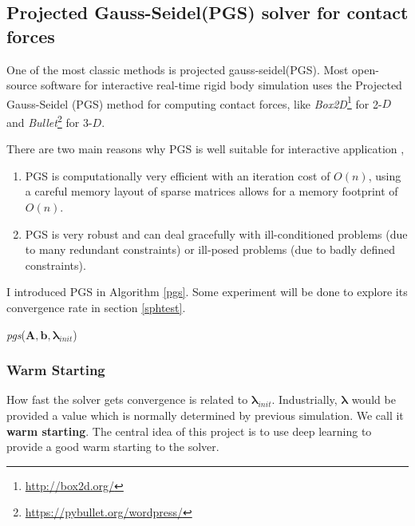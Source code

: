    \subsection{Projected Gauss-Seidel(PGS) solver for contact forces}
    One of the most classic methods is projected gauss-seidel(PGS). Most open-source software for interactive real-time rigid body simulation uses the Projected Gauss-Seidel (PGS) method for computing contact forces, like \textit{Box2D}\footnote{\url{http://box2d.org/}} for 2-$D$ and \textit{Bullet}\footnote{\url{https://pybullet.org/wordpress/}} for 3-$D$. 

    There are two main reasons why PGS is well suitable for interactive application \cite{Erleben:2007:VSP:1243980.1243986}, 
    \begin{enumerate}
        \item PGS is computationally very efficient with an iteration cost of $O(n)$, using a careful memory layout of sparse matrices allows for a memory footprint of $O(n)$.
        \item PGS is very robust and can deal gracefully with ill-conditioned problems (due to many redundant constraints) or ill-posed problems (due to badly defined constraints).
    \end{enumerate}
    I introduced PGS in Algorithm \ref{pgs}. Some experiment will be done to explore its convergence rate in section \ref{sphtest}.
    \begin{algorithm}[!h]
        \caption{\textit{pgs}($\pmb{A}, \pmb{b}, \pmb{\lambda}_{init}$)}
        \label{pgs}
    \end{algorithm}
    \subsubsection{Warm Starting}
    How fast the solver gets convergence is related to $\pmb{\lambda}_{init}$. Industrially, $\pmb{\lambda}$ would be provided a value which is normally determined by previous simulation. We call it \textbf{warm starting}. The central idea of this project is to use deep learning to provide a good warm starting to the solver. 

